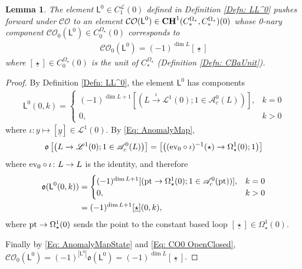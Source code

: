 \documentclass[10pt]{amsart}
\numberwithin{equation}{section}
\theoremstyle{plain}
\newtheorem{lemma}[theorem]{Lemma}
\theoremstyle{definition}
\theoremstyle{remark}
\numberwithin{equation}{section}
\newcommand{\ev}{\textup{ev}}
\newcommand{\mf}[1]{\mathfrak{#1}}
\newcommand{\ms}[1]{\mathscr{#1}}
\newcommand{\pt}{\textup{pt}}
\newcommand{\CO}{\mathcal{CO}}
\newcommand{\CC}{\textbf{\textup{CH}}}
\newcommand{\CBa}{C_*^{\Omega_\star}}
\newcommand{\Cfr}[1]{C_{#1}^\mathscr{L}}
\newcommand{\Cba}[1]{C_{#1}^{\Omega_\star}}
\newcommand{\LL}{\textsf{L}}
\begin{document}
{\begin{lemma}\label{Lm: COtoStar}
	The element $\LL^0 \in \Cfr{1}(0)$ defined in Definition \ref{Defn: LL^0} pushes forward under $\CO$ to an element $\CO(\LL^0)\in \CC^{1}(\CBa,\CBa)(0)$ whose 0-nary component $\CO_0(\LL^0)\in \Cba{0}(0)$ corresponds to 
	\begin{align*}
		\CO_0(\LL^0) = (-1)^{\dim L}[\underline{\star}]
	\end{align*}
	where $[\underline{\star}]\in \Cba{0}(0)$ is the unit of $\CBa$ (Definition \ref{Defn: CBaUnit}).
\end{lemma}
\begin{proof}
	By Definition \ref{Defn: LL^0}, the element $\LL^0$ has components
	\begin{align*}
		\LL^0(0,k) = \begin{cases}
			(-1)^{\dim L + 1}[(L\xrightarrow{\iota} \mathscr{L}^1(0); 1\in \mathscr{A}_c^0(L))], & k = 0\\
			0, & k> 0
		\end{cases}
	\end{align*}
	where $\iota\colon y \mapsto [\underline{y}]\in \ms{L}^1(0)$.
	By \eqref{Eq: AnomalyMap}, \[ \mf{o}\left[\big(L\to \mathscr{L}^1(0); 1\in \mathscr{A}_c^0(L)\big)\right] =\left[\big( (\ev_0\circ \iota)^{-1}(\star) \to \Omega^1_\star(0); 1 \big)\right]  \]
	where $\ev_0\circ\iota \colon L\to L$ is the identity, and therefore 
	\begin{align*}
		\mf{o}(\LL^0(0,k)) &= \begin{cases}
		(-1)^{\dim L + 1} [(\pt \to \Omega^1_\star (0); 1\in \ms{A}^0_c(\pt))], & k = 0\\
		0, & k > 0
	\end{cases} \\
	&= (-1)^{\dim L + 1}[\underline{\star}](0,k),
	\end{align*}
	where $\pt \to \Omega^1_\star(0)$ sends the point to the constant based loop $[\underline{\star}]\in \Omega^1_\star (0)$.
	
	Finally by \eqref{Eq: AnomalyMapState} and \eqref{Eq: CO0 OpenClosed}, $\CO_0(\LL^0)= (-1)^{|\LL^0|}\mf{o}(\LL^0) = (-1)^{\dim L }[\underline{\star}]$.
\end{proof}



}
\end{document}
